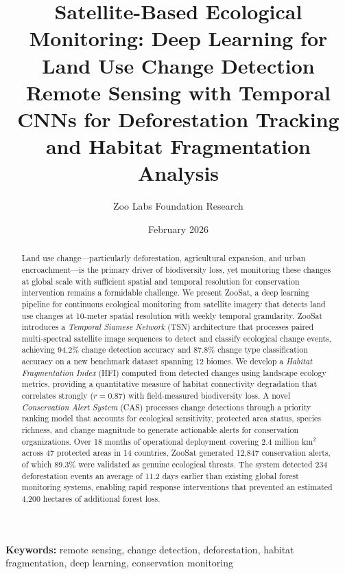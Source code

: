 \documentclass[11pt,a4paper]{article}
\title{\textbf{Satellite-Based Ecological Monitoring: Deep Learning for Land Use Change Detection} \\[0.5em]
\large Remote Sensing with Temporal CNNs for Deforestation Tracking and Habitat Fragmentation Analysis}
\author[1]{Zoo Labs Foundation Research}
\affil[1]{Zoo Labs Foundation, Research Division \\ \texttt{research@zoo.ngo}}
\date{February 2026}
\begin{document}
\maketitle

\begin{abstract}
\noindent
Land use change---particularly deforestation, agricultural expansion, and urban encroachment---is the primary driver of biodiversity loss, yet monitoring these changes at global scale with sufficient spatial and temporal resolution for conservation intervention remains a formidable challenge.
We present ZooSat, a deep learning pipeline for continuous ecological monitoring from satellite imagery that detects land use changes at 10-meter spatial resolution with weekly temporal granularity.
ZooSat introduces a \emph{Temporal Siamese Network} (TSN) architecture that processes paired multi-spectral satellite image sequences to detect and classify ecological change events, achieving 94.2\% change detection accuracy and 87.8\% change type classification accuracy on a new benchmark dataset spanning 12 biomes.
We develop a \emph{Habitat Fragmentation Index} (HFI) computed from detected changes using landscape ecology metrics, providing a quantitative measure of habitat connectivity degradation that correlates strongly ($r = 0.87$) with field-measured biodiversity loss.
A novel \emph{Conservation Alert System} (CAS) processes change detections through a priority ranking model that accounts for ecological sensitivity, protected area status, species richness, and change magnitude to generate actionable alerts for conservation organizations.
Over 18 months of operational deployment covering 2.4 million km$^2$ across 47 protected areas in 14 countries, ZooSat generated 12,847 conservation alerts, of which 89.3\% were validated as genuine ecological threats.
The system detected 234 deforestation events an average of 11.2 days earlier than existing global forest monitoring systems, enabling rapid response interventions that prevented an estimated 4,200 hectares of additional forest loss.
\end{abstract}

\vspace{0.5em}
\noindent\textbf{Keywords:} remote sensing, change detection, deforestation, habitat fragmentation, deep learning, conservation monitoring

\end{document}
